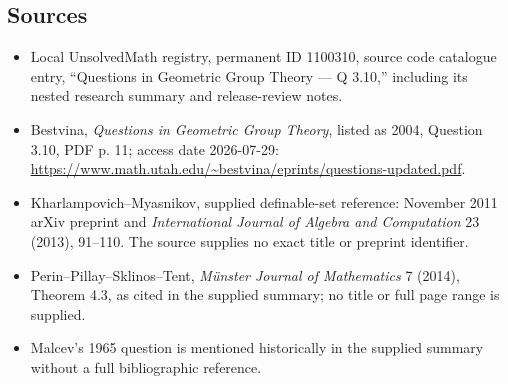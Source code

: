 \documentclass[11pt]{article}
\begin{document}
\subsection{Sources}
\begin{itemize}
\item Local UnsolvedMath registry, permanent ID 1100310, source code catalogue entry, ``Questions in Geometric Group Theory --- Q 3.10,'' including its nested research summary and release-review notes.
\item Bestvina, \emph{Questions in Geometric Group Theory}, listed as 2004, Question 3.10, PDF p. 11; access date 2026-07-29: \url{https://www.math.utah.edu/~bestvina/eprints/questions-updated.pdf}.
\item Kharlampovich--Myasnikov, supplied definable-set reference: November 2011 arXiv preprint and \emph{International Journal of Algebra and Computation} 23 (2013), 91--110. The source supplies no exact title or preprint identifier.
\item Perin--Pillay--Sklinos--Tent, \emph{M\"unster Journal of Mathematics} 7 (2014), Theorem 4.3, as cited in the supplied summary; no title or full page range is supplied.
\item Malcev's 1965 question is mentioned historically in the supplied summary without a full bibliographic reference.
\end{itemize}
\end{document}

